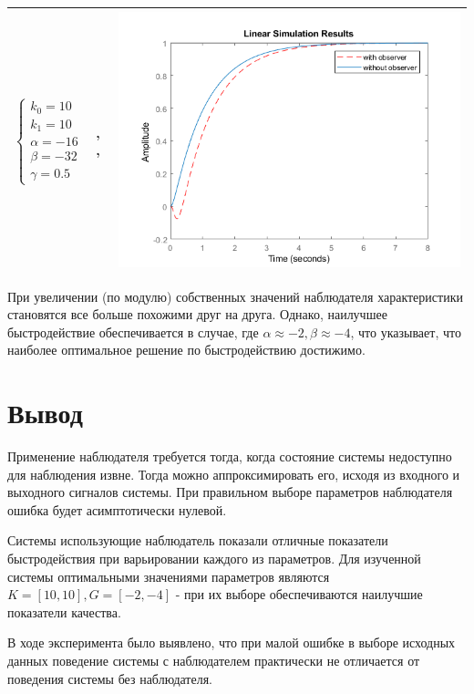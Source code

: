 \begin{longtable}{ | m{4cm} | m{4cm} | m{8cm} | }
		$\begin{cases} k_0=10 \\ k_1=10 \\ \alpha=-16 \\ \beta= -32 \\ \gamma=0.5 \end{cases}$ &
		\text{С наблюдателем:}\linebreak
		\text{$\Omega=8.61$}, \text{$MinRe=0.97$} 
		\text{Без наблюдателя:}\linebreak
		\text{$\Omega=3.27$}, \text{$MinRe=0.97$} & 
		\begin{minipage}{.3\textwidth}
			\includegraphics[scale = 0.46]{images/g3.png}
		\end{minipage}
		\\\hline
		
\end{longtable}

\FloatBarrier

При увеличении (по модулю) собственных значений наблюдателя характеристики становятся все больше похожими друг на друга. Однако, наилучшее быстродействие обеспечивается в случае, где $\alpha\approx-2, \beta\approx-4$, что указывает, что наиболее оптимальное решение по быстродействию достижимо.

\section{Вывод}

Применение наблюдателя требуется тогда, когда состояние системы недоступно для наблюдения извне. Тогда можно аппроксимировать его, исходя из входного и выходного сигналов системы. При правильном выборе параметров наблюдателя ошибка будет асимптотически нулевой.

Системы использующие наблюдатель показали отличные показатели быстродействия при варьировании каждого из параметров. Для изученной системы оптимальными значениями параметров являются $K=[10, 10], G=[-2, -4]$ - при их выборе обеспечиваются наилучшие показатели качества.

В ходе эксперимента было выявлено, что при малой ошибке в выборе исходных данных поведение системы с наблюдателем практически не отличается от поведения системы без наблюдателя.

